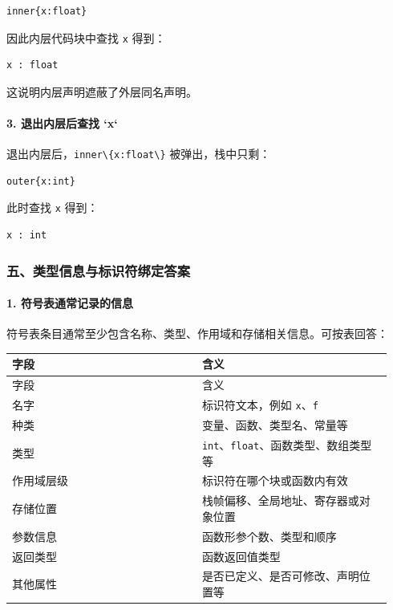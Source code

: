\documentclass[UTF8]{ctexart}
\begin{document}
\begin{Verbatim}[fontsize=\small,breaklines=true]
inner{x:float}
\end{Verbatim}

因此内层代码块中查找 \texttt{x} 得到：

\begin{Verbatim}[fontsize=\small,breaklines=true]
x : float
\end{Verbatim}

这说明内层声明遮蔽了外层同名声明。

\paragraph*{3. 退出内层后查找 `x`}

退出内层后，\texttt{inner\textbackslash{}\{x:float\textbackslash{}\}} 被弹出，栈中只剩：

\begin{Verbatim}[fontsize=\small,breaklines=true]
outer{x:int}
\end{Verbatim}

此时查找 \texttt{x} 得到：

\begin{Verbatim}[fontsize=\small,breaklines=true]
x : int
\end{Verbatim}

\subsubsection*{五、类型信息与标识符绑定答案}

\paragraph*{1. 符号表通常记录的信息}

符号表条目通常至少包含名称、类型、作用域和存储相关信息。可按表回答：

\begin{longtable}{|p{0.47\linewidth}|p{0.47\linewidth}|}
\hline
字段 & 含义 \\
\hline
\endfirsthead
字段 & 含义 \\
\hline
\endhead
名字 & 标识符文本，例如 \texttt{x}、\texttt{f} \\
\hline
种类 & 变量、函数、类型名、常量等 \\
\hline
类型 & \texttt{int}、\texttt{float}、函数类型、数组类型等 \\
\hline
作用域层级 & 标识符在哪个块或函数内有效 \\
\hline
存储位置 & 栈帧偏移、全局地址、寄存器或对象位置 \\
\hline
参数信息 & 函数形参个数、类型和顺序 \\
\hline
返回类型 & 函数返回值类型 \\
\hline
其他属性 & 是否已定义、是否可修改、声明位置等 \\
\hline
\end{longtable}
\end{document}
